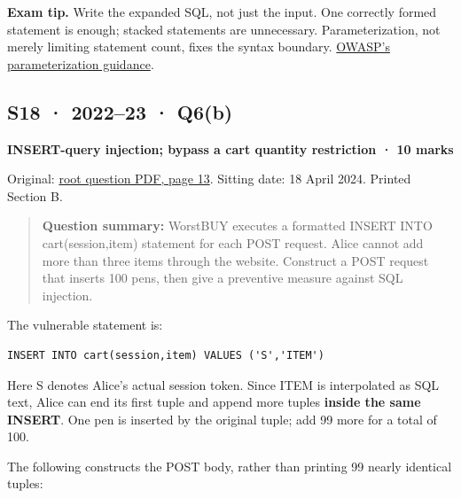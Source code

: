 \documentclass[11pt,a4paper]{article}
\begin{document}
{\color{ForestGreen}\textbf{Exam tip.} Write the expanded SQL,\allowbreak{} not just the input. One correctly formed statement is enough; stacked statements are unnecessary. Parameterization,\allowbreak{} not merely limiting statement count,\allowbreak{} fixes the syntax boundary. \href{https://cheatsheetseries.owasp.org/cheatsheets/SQL_Injection_Prevention_Cheat_Sheet.html}{OWASP’s parameterization guidance}.}




\clearpage
\subsection{S18 · 2022–23 · Q6(b)}\label{s18}

\textbf{INSERT-query injection; bypass a cart quantity restriction · 10 marks}


Original: \href{../../CSE405-Security_Merged.pdf\#page=13}{root question PDF,\allowbreak{} page 13}. Sitting date: 18 April 2024. Printed Section B.



\begin{quote}\small

\textbf{Question summary:} WorstBUY executes a formatted INSERT INTO cart(session,\allowbreak{}item) statement for each POST request. Alice cannot add more than three items through the website. Construct a POST request that inserts 100 pens,\allowbreak{} then give a preventive measure against SQL injection.



\end{quote}

The vulnerable statement is:



\begin{Verbatim}[breaklines=true,breakanywhere=true,fontsize=\small,frame=single,rulecolor=\color{PanelBorder}]
INSERT INTO cart(session,item) VALUES ('S','ITEM')
\end{Verbatim}

Here S denotes Alice’s actual session token. Since ITEM is interpolated as SQL text,\allowbreak{} Alice can end its first tuple and append more tuples \textbf{inside the same INSERT}. One pen is inserted by the original tuple; add 99 more for a total of 100.


The following constructs the POST body,\allowbreak{} rather than printing 99 nearly identical tuples:
\end{document}
